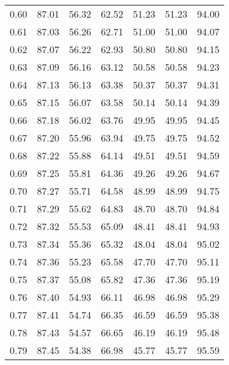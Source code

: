 \begin{tabular}{|c|c|c|c|c|c|c|}
      0.60 &     87.01 &     56.32 &      62.52 &   51.23 &      51.23 &         94.00 \\
      0.61 &     87.03 &     56.26 &      62.71 &   51.00 &      51.00 &         94.07 \\
      0.62 &     87.07 &     56.22 &      62.93 &   50.80 &      50.80 &         94.15 \\
      0.63 &     87.09 &     56.16 &      63.12 &   50.58 &      50.58 &         94.23 \\
      0.64 &     87.13 &     56.13 &      63.38 &   50.37 &      50.37 &         94.31 \\
      0.65 &     87.15 &     56.07 &      63.58 &   50.14 &      50.14 &         94.39 \\
      0.66 &     87.18 &     56.02 &      63.76 &   49.95 &      49.95 &         94.45 \\
      0.67 &     87.20 &     55.96 &      63.94 &   49.75 &      49.75 &         94.52 \\
      0.68 &     87.22 &     55.88 &      64.14 &   49.51 &      49.51 &         94.59 \\
      0.69 &     87.25 &     55.81 &      64.36 &   49.26 &      49.26 &         94.67 \\
      0.70 &     87.27 &     55.71 &      64.58 &   48.99 &      48.99 &         94.75 \\
      0.71 &     87.29 &     55.62 &      64.83 &   48.70 &      48.70 &         94.84 \\
      0.72 &     87.32 &     55.53 &      65.09 &   48.41 &      48.41 &         94.93 \\
      0.73 &     87.34 &     55.36 &      65.32 &   48.04 &      48.04 &         95.02 \\
      0.74 &     87.36 &     55.23 &      65.58 &   47.70 &      47.70 &         95.11 \\
      0.75 &     87.37 &     55.08 &      65.82 &   47.36 &      47.36 &         95.19 \\
      0.76 &     87.40 &     54.93 &      66.11 &   46.98 &      46.98 &         95.29 \\
      0.77 &     87.41 &     54.74 &      66.35 &   46.59 &      46.59 &         95.38 \\
      0.78 &     87.43 &     54.57 &      66.65 &   46.19 &      46.19 &         95.48 \\
      0.79 &     87.45 &     54.38 &      66.98 &   45.77 &      45.77 &         95.59 \\

\end{tabular}
